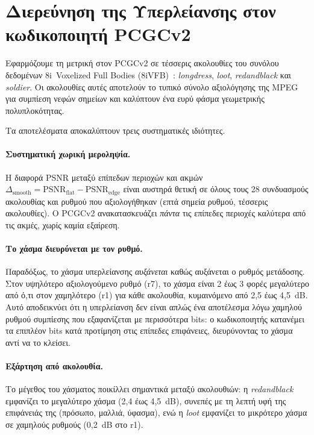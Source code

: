 \section{Διερεύνηση της Υπερλείανσης στον κωδικοποιητή PCGCv2}

Εφαρμόζουμε τη μετρική στον PCGCv2 σε τέσσερις ακολουθίες του συνόλου δεδομένων
8i~Voxelized Full Bodies (8iVFB)~\cite{8ivfb}: \textit{longdress}, \textit{loot},
\textit{redandblack} και \textit{soldier}.
Οι ακολουθίες αυτές αποτελούν το τυπικό σύνολο αξιολόγησης της MPEG για
συμπίεση νεφών σημείων και καλύπτουν ένα ευρύ φάσμα γεωμετρικής πολυπλοκότητας.

Τα αποτελέσματα αποκαλύπτουν τρεις συστηματικές ιδιότητες.

\paragraph{Συστηματική χωρική μεροληψία.}
Η διαφορά PSNR μεταξύ επίπεδων περιοχών και ακμών
$\Delta_{\mathrm{smooth}} = \mathrm{PSNR}_{\mathrm{flat}} - \mathrm{PSNR}_{\mathrm{edge}}$
είναι αυστηρά θετική σε όλους τους 28 συνδυασμούς ακολουθίας και ρυθμού που αξιολογήθηκαν
(επτά σημεία ρυθμού, τέσσερις ακολουθίες).
Ο PCGCv2 ανακατασκευάζει \emph{πάντα} τις επίπεδες περιοχές καλύτερα από τις ακμές,
χωρίς καμία εξαίρεση.

\paragraph{Το χάσμα διευρύνεται με τον ρυθμό.}
Παραδόξως, το χάσμα υπερλείανσης \emph{αυξάνεται} καθώς αυξάνεται ο ρυθμός μετάδοσης.
Στον υψηλότερο αξιολογούμενο ρυθμό (r7), το χάσμα είναι 2 έως 3 φορές μεγαλύτερο
από ό,τι στον χαμηλότερο (r1) για κάθε ακολουθία, κυμαινόμενο από 2,5 έως 4,5~dB.
Αυτό αποδεικνύει ότι η υπερλείανση δεν είναι απλώς ένα αποτέλεσμα λόγω χαμηλού ρυθμού συμπίεσης
που εξαφανίζεται με περισσότερα bits: ο κωδικοποιητής κατανέμει τα επιπλέον bits
κατά προτίμηση στις επίπεδες επιφάνειες, διευρύνοντας το χάσμα αντί να το κλείσει.

\paragraph{Εξάρτηση από ακολουθία.}
Το μέγεθος του χάσματος ποικίλλει σημαντικά μεταξύ ακολουθιών: η \textit{redandblack}
εμφανίζει το μεγαλύτερο χάσμα (2,4 έως 4,5~dB), συνεπές με τη λεπτή υφή της επιφάνειάς της
(πρόσωπο, μαλλιά, ύφασμα), ενώ η \textit{loot} εμφανίζει το μικρότερο χάσμα σε χαμηλούς
ρυθμούς (0,2~dB στο r1).

